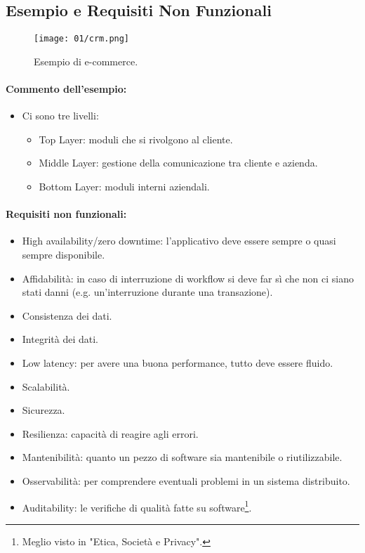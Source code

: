 \subsection{Esempio e Requisiti Non Funzionali}

\begin{figure}[h]
	\centering
	\texttt{[image: 01/crm.png]}
	\caption{Esempio di e-commerce.}
\end{figure}

\paragraph{Commento dell'esempio:}

\begin{itemize}
	\item Ci sono tre livelli:
	      \begin{itemize}
		      \item Top Layer: moduli che si rivolgono al cliente.
		      \item Middle Layer: gestione della comunicazione tra cliente e azienda.
		      \item Bottom Layer: moduli interni aziendali.
	      \end{itemize}
\end{itemize}

\paragraph{Requisiti non funzionali:}

\begin{itemize}
	\item High availability/zero downtime: l'applicativo deve essere sempre o quasi sempre disponibile.
	\item Affidabilità: in caso di interruzione di workflow si deve far sì che non ci siano stati danni (e.g. un'interruzione durante una transazione).
	\item Consistenza dei dati.
	\item Integrità dei dati.
	\item Low latency: per avere una buona performance, tutto deve essere fluido.
	\item Scalabilità.
	\item Sicurezza.
	\item Resilienza: capacità di reagire agli errori.
	\item Mantenibilità: quanto un pezzo di software sia mantenibile o riutilizzabile.
	\item Osservabilità: per comprendere eventuali problemi in un sistema distribuito.
	\item Auditability: le verifiche di qualità fatte su software\footnote{Meglio visto in "Etica, Società e Privacy".}.
\end{itemize}


